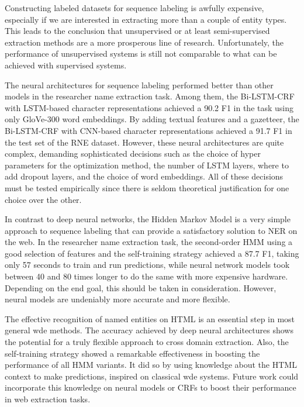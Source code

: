 \documentclass{nle}
\begin{document}
Constructing labeled datasets for sequence labeling is awfully expensive, especially if we
are interested in extracting more than a couple of entity types. This leads to the
conclusion that unsupervised or at least semi-supervised extraction methods are a more 
prosperous line of research. Unfortunately, the performance of unsupervised systems is still
not comparable to what can be achieved with supervised systems.

The neural architectures for sequence labeling performed better than other models in the 
researcher name extraction task. Among them, the Bi-LSTM-CRF with LSTM-based character 
representations achieved a 90.2 F1 in the task using only GloVe-300 word embeddings. By adding
textual features and a gazetteer, the Bi-LSTM-CRF with CNN-based character representations
achieved a 91.7 F1 in the test set of the RNE dataset. However, these neural architectures are
quite complex, demanding sophisticated decisions such as the choice of hyper parameters for the 
optimization method, the number of LSTM layers, where to add dropout layers, and the choice of 
word embeddings. All of these decisions
must be tested empirically since there is seldom theoretical justification for one choice over
the other.

In contrast to deep neural networks, the Hidden Markov Model is a very simple approach to 
sequence labeling that can provide a satisfactory solution to NER on the web. In the researcher
name extraction task, the second-order HMM using a good selection of features and the self-training
strategy achieved a 87.7 F1, taking only 57 seconds to train and run predictions, while neural 
network models took between 40 and 80 times longer to do the same with more expensive hardware.
Depending on the end goal, this should be taken in consideration. However, neural models are
undeniably more accurate and more flexible.

The effective recognition of named entities on HTML is an essential step in most general 
\gls{wde} methods. The accuracy achieved by deep neural architectures
shows the potential for a truly flexible approach to cross domain extraction.
Also, the self-training strategy showed a remarkable effectiveness in boosting the performance 
of all HMM variants. It did so by using knowledge about the HTML context to make predictions,
inspired on classical \gls{wde} systems. Future work could incorporate this 
knowledge on neural models or CRFs to boost their performance in web extraction
tasks.


% 
% 
\end{document}
